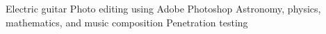 \begin{cvskills}
  \cvskill {} {Electric guitar}
	\cvskill {} {Photo editing using Adobe Photoshop}
	\cvskill {} {Astronomy, physics, mathematics, and music composition}
	\cvskill {} {Penetration testing}
  \end{cvskills}

